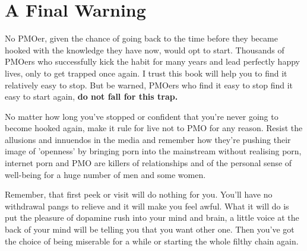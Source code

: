 \documentclass[easypeasy.tex]{subfiles}
\begin{document}
\section{A Final Warning}

No PMOer, given the chance of going back to the time before they became hooked with the knowledge they have now, would opt to start. Thousands of PMOers who successfully kick the habit for many years and lead perfectly happy lives, only to get trapped once again. I trust this book will help you to find it relatively easy to stop. But be warned, PMOers who find it easy to stop find it easy to start again, \textbf{do not fall for this trap.}

No matter how long you've stopped or confident that you're never going to become hooked again, make it rule for live not to PMO for any reason. Resist the allusions and innuendos in the media and remember how they're pushing their image of 'openness' by bringing porn into the mainstream without realising porn, internet porn and PMO are killers of relationships and of the personal sense of well-being for a huge number of men and some women.

Remember, that first peek or visit will do nothing for you. You'll have no withdrawal pangs to relieve and it will make you feel awful. What it will do is put the pleasure of dopamine rush into your mind and brain, a little voice at the back of your mind will be telling you that you want other one. Then you've got the choice of being miserable for a while or starting the whole filthy chain again.
\end{document}
